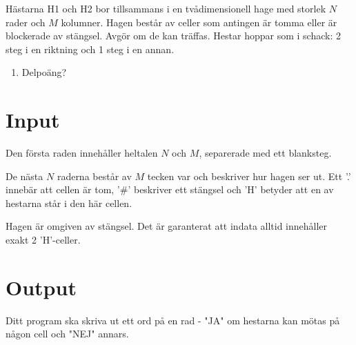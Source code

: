 Hästarna H1 och H2 bor tillsammans i en tvådimensionell hage med storlek $N$ rader och $M$ kolumner. Hagen består av celler som antingen är tomma eller är blockerade av stängsel. Avgör om de kan träffas. Hestar hoppar som i schack: 2 steg i en riktning och 1 steg i en annan.

\begin{enumerate}
\item Delpoäng?
\end{enumerate}

\section*{Input}
Den första raden innehåller heltalen $N$ och $M$, separerade med ett blanksteg.

De nästa $N$ raderna består av $M$ tecken var och beskriver hur hagen ser ut. Ett '.' innebär att cellen är tom, '\#' beskriver ett stängsel och 'H' betyder att en av hestarna står i den här cellen.

Hagen är omgiven av stängsel. Det är garanterat att indata alltid innehåller exakt 2 'H'-celler.

\section*{Output}
Ditt program ska skriva ut ett ord på en rad - "JA" om hestarna kan mötas på någon cell och "NEJ" annars.

